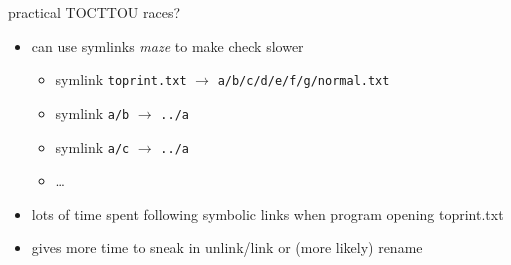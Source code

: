 \begin{frame}{practical TOCTTOU races?}
    \begin{itemize}
    \item can use symlinks \textit{maze} to make check slower
    \begin{itemize}
        \item symlink \texttt{toprint.txt} $\rightarrow$ \texttt{a/b/c/d/e/f/g/normal.txt}
        \item symlink \texttt{a/b} $\rightarrow$ \texttt{../a}
        \item symlink \texttt{a/c} $\rightarrow$ \texttt{../a}
        \item \ldots
    \end{itemize}
    \item lots of time spent following symbolic links when program opening toprint.txt
    \item gives more time to sneak in unlink/link or (more likely) rename
    \end{itemize}
\end{frame}
